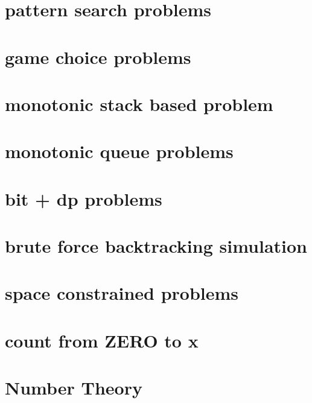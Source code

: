 \chapter{pattern search problems}
\chapter{game choice problems}

\chapter{monotonic stack based problem}
\chapter{monotonic queue problems}
\chapter{bit + dp problems}
\chapter{brute force backtracking simulation}
\chapter{space constrained problems}
\chapter{count from ZERO to x}

\chapter{Number Theory}


